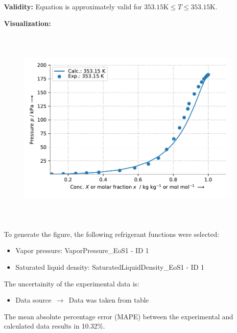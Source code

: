 \textbf{Validity:}
\newline
Equation is approximately valid for $353.15 \si{\kelvin} \leq T \leq 353.15 \si{\kelvin}$.
\newline

\textbf{Visualization:}
%
\begin{figure}[!htp]
{\noindent\includegraphics[height=10cm, keepaspectratio]{figs/abs/abs_Methanol_ionic_liquid_[MMIM]+[(CH3)2PO4]-_UniquacFixedDu_1.pdf}}
\end{figure}
%

To generate the figure, the following refrigerant functions were selected:
\begin{itemize}
\item Vapor pressure: VaporPressure\_EoS1 - ID 1
\item Saturated liquid density: SaturatedLiquidDensity\_EoS1 - ID 1
\end{itemize}

The uncertainity of the experimental data is:
\begin{itemize}
\item Data source $\,\to\,$ Data was taken from table
\end{itemize}

The mean absolute percentage error (MAPE) between the experimental and calculated data results in 10.32\%.
\FloatBarrier
\newpage
